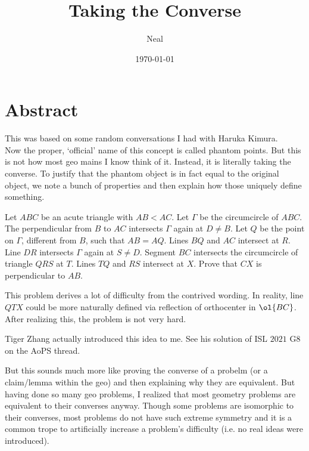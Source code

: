 \documentclass{seto}
\title{Taking the Converse}
\author{Neal}
\date\today
\begin{document}
\maketitle
\section{Abstract}
This was based on some random conversations I had with Haruka Kimura.\\[4pt]
Now the proper, `official' name of this concept is called phantom points.
But this is not how most geo mains I know think of it. Instead, 
it is literally taking the converse. To justify that the phantom
object is in fact equal to the original object, we 
note a bunch of properties and then explain how those
uniquely define something.
\begin{block}
Let $ABC$ be an acute triangle with $AB < AC$. 
Let $\Gamma$ be the circumcircle of $ABC$. 
The perpendicular from $B$ to $AC$ intersects $\Gamma$ again at $D\neq B$. 
Let $Q$ be the point on $\Gamma$, different from $B$, such that $AB=AQ$.
Lines $BQ$ and $AC$ intersect at $R$. 
Line $DR$ intersects $\Gamma$ again at $S\neq D$. 
Segment $BC$ intersects the circumcircle of triangle $QRS$ at $T$. 
Lines $TQ$ and $RS$ intersect at $X$. 
Prove that $CX$ is perpendicular to $AB$.
\end{block}
This problem derives a lot of difficulty from the contrived wording. In reality, line $QTX$ 
could be more naturally defined via reflection of orthocenter in $\ol{BC}$. 
After realizing this, the problem is not very hard.
\begin{remark}[Credits] Tiger Zhang actually introduced this idea to me. See his solution of 
ISL $2021$ G$8$ on the AoPS thread.
\end{remark}
But this sounds much more like proving the converse of a probelm (or a claim/lemma
within the geo) and then explaining why they are equivalent. But having done so many geo problems,
I realized that most geometry problems are equivalent to their converses anyway. 
Though some problems are isomorphic to their converses, most problems 
do not have such extreme symmetry and it is a common trope to artificially
increase a problem's difficulty (i.e. no real ideas were introduced).
\end{document}
